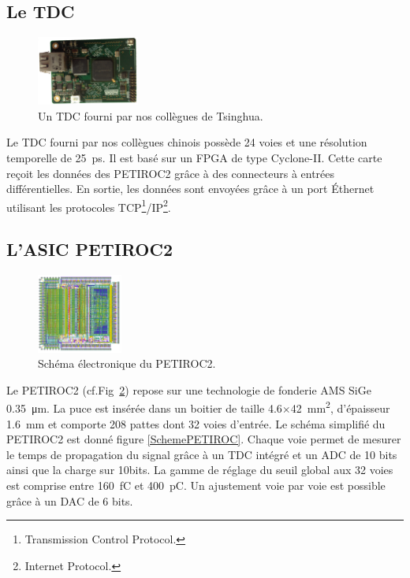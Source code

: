 \subsection{Le TDC}
\begin{figure}
	\vspace*{-1cm}
	\centering
	\includegraphics[width=0.30\textwidth]{ELE/TDC.png}
	\caption{Un TDC fourni par nos collègues de Tsinghua.}
	\label{tdc}
\end{figure}
Le TDC fourni par nos collègues chinois possède \num{24} voies et une résolution temporelle de \SI{25}{\pico\second}. Il est basé sur un FPGA de type Cyclone-II. Cette carte reçoit les données des PETIROC2 grâce à des connecteurs à entrées différentielles. En sortie, les données sont envoyées grâce à un port Éthernet utilisant les protocoles TCP\footnote{Transmission Control Protocol.}/IP\footnote{Internet Protocol.}.

\subsection{L'ASIC PETIROC2}

\begin{figure}
	\centering
	\vspace*{-1cm}
	\includegraphics[width=0.25\textwidth]{ELE/PETIROC.png}
	\caption{Schéma électronique du PETIROC2.}
	\label{PETIROC2}
\end{figure}

Le PETIROC2 (cf.Fig~\ref{PETIROC2}) repose sur une technologie de fonderie AMS SiGe \SI{0.35}{\micro\meter}. La puce est insérée dans un boitier de taille \num{4.6}$\times$\SI{42}{\square\milli\meter}, d'épaisseur \SI{1.6}{\milli\meter} et comporte \num{208} pattes dont \num{32} voies d'entrée. Le schéma simplifié du PETIROC2 est donné figure \ref{SchemePETIROC}. Chaque voie permet de mesurer le temps de propagation du signal grâce à un TDC intégré et un ADC de \num{10} bits ainsi que la charge sur \num{10}bits. La gamme de réglage du seuil global aux \num{32} voies est comprise entre \SI{160}{\femto\coulomb} et \SI{400}{\pico\coulomb}. Un ajustement voie par voie est possible grâce à un DAC de \num{6} bits. 

